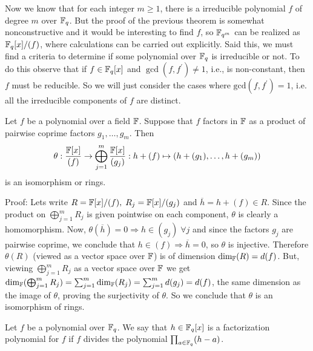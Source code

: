 Now we know that for each integer $m\geq1$, there is a irreducible polynomial $f$ of degree $m$ over $\mathbb{F}_q$. But the proof of the previous theorem is somewhat nonconstructive and it would be interesting to find $f$, so $\mathbb{F}_{q^m}$ can be realized as $\mathbb{F}_q[x]/(f)$, where calculations can be carried out explicitly. Said this, we must find a criteria to determine if some polynomial over $\mathbb{F}_q$ is irreducible or not. To do this observe that if $f\in\mathbb{F}_q[x]$ and $\gcd(f,f^\prime)\neq1$, i.e., is non-constant, then $f$ must be reducible. So we will just consider the cases where $\text{gcd}(f,f^\prime)=1$, i.e. all the irreducible components of $f$ are distinct.
\begin{dang}
    \begin{lemma}\cite{isaacs2009algebra}\label{chinese remainder theorem}
        Let $f$ be a polynomial over a field $\mathbb{F}$. Suppose that $f$ factors in $\mathbb{F}$ as a product of pairwise coprime factors $g_1,\dots,g_m$. Then
        \begin{equation}
            \theta:\frac{\mathbb{F}[x]}{(f)}\rightarrow \bigoplus_{j=1}^m\frac{\mathbb{F}[x]}{(g_j)}: h+(f)\mapsto (h+(g_1),\dots, h+(g_m))
        \end{equation}
        is an isomorphism or rings. 
    \end{lemma}
\end{dang}
Proof: Lets write $R=\mathbb{F}[x]/(f),\;R_j=\mathbb{F}[x]/(g_j)$ and $\overline{h}=h+(f)\in R$. Since the product on $\bigoplus_{j=1}^mR_j$ is given pointwise on each component, $\theta$ is clearly a homomorphism. Now, $\theta(\overline{h})=0\Rightarrow h\in (g_j)\;\forall j$ and since the factors $g_j$ are pairwise coprime, we conclude that $h\in (f)\Rightarrow\overline{h}=0$, so $\theta$ is injective. Therefore $\theta(R)$ (viewed as a vector space over $\mathbb{F}$) is of dimension $\text{dim}_{\mathbb{F}}(R)=d(f)$. But, viewing $\bigoplus_{j=1}^mR_j$ as a vector space over $\mathbb{F}$ we get $\text{dim}_{\mathbb{F}}(\bigoplus_{j=1}^mR_j)=\sum_{j=1}^m\text{dim}_{\mathbb{F}}(R_j)=\sum_{j=1}^md(g_j)=d(f)$, the same dimension as the image of $\theta$, proving the surjectivity of $\theta$. So we conclude that $\theta$ is an isomorphism of rings.
\begin{dang}
    \begin{definition}\cite{isaacs2009algebra}
        Let $f$ be a polynomial over $\mathbb{F}_q$. We say that $h\in\mathbb{F}_q[x]$ is a factorization polynomial for $f$ if $f$ divides the polynomial $\prod_{a\in\mathbb{F}_q}(h-a)$.
    \end{definition}
\end{dang}
